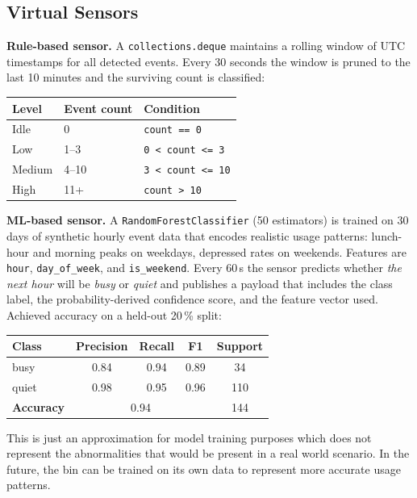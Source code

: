 \documentclass[10pt,a4paper]{article}
\begin{document}
\subsection{Virtual Sensors}

\textbf{Rule-based sensor.} A \texttt{collections.deque} maintains a rolling window of
UTC timestamps for all detected events. Every 30 seconds the window is pruned to the
last 10 minutes and the surviving count is classified:

\begin{center}
\begin{tabular}{@{}lll@{}}
\toprule
\textbf{Level} & \textbf{Event count} & \textbf{Condition} \\
\midrule
Idle   & 0    & \texttt{count == 0} \\
Low    & 1--3 & \texttt{0 < count <= 3} \\
Medium & 4--10 & \texttt{3 < count <= 10} \\
High   & 11+  & \texttt{count > 10} \\
\bottomrule
\end{tabular}
\end{center}

\textbf{ML-based sensor.} A \texttt{RandomForestClassifier} (50 estimators) is trained
on 30 days of synthetic hourly event data that encodes realistic usage patterns:
lunch-hour and morning peaks on weekdays, depressed rates on weekends. Features are
\texttt{hour}, \texttt{day\_of\_week}, and \texttt{is\_weekend}. Every 60\,s the sensor
predicts whether \textit{the next hour} will be \textit{busy} or \textit{quiet} and
publishes a payload that includes the class label, the probability-derived confidence
score, and the feature vector used. Achieved accuracy on a held-out 20\,\% split:

\begin{center}
\begin{tabular}{@{}lcccc@{}}
\toprule
\textbf{Class} & \textbf{Precision} & \textbf{Recall} & \textbf{F1} & \textbf{Support} \\
\midrule
busy  & 0.84 & 0.94 & 0.89 & 34  \\
quiet & 0.98 & 0.95 & 0.96 & 110 \\
\midrule
\textbf{Accuracy} & \multicolumn{3}{c}{0.94} & 144 \\
\bottomrule
\end{tabular}
\end{center}

This is just an approximation for model training purposes which does not represent the abnormalities that would be present in a real world scenario. In the future, the bin can be trained on its own data to represent more accurate usage patterns.
\end{document}
